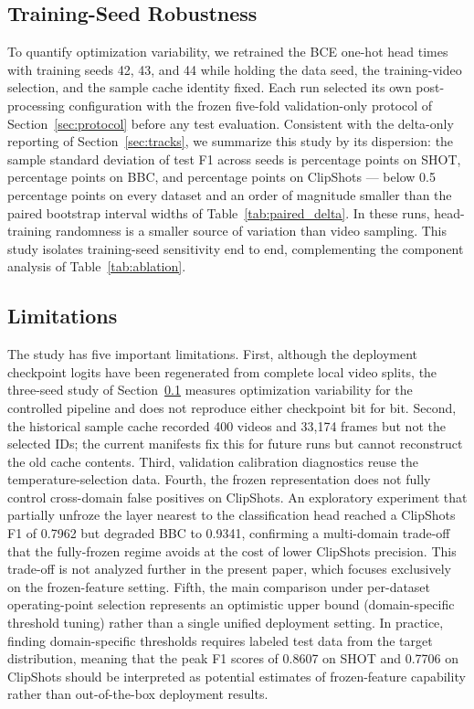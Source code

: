 \subsection{Training-Seed Robustness}
\label{sec:seed_robustness}

To quantify optimization variability, we retrained the BCE one-hot head
\PaperSeedCount{} times with training seeds 42, 43, and 44 while holding the
data seed, the training-video selection, and the sample cache identity fixed.
Each run selected its own post-processing configuration with the frozen
five-fold validation-only protocol of Section~\ref{sec:protocol} before any
test evaluation. Consistent with the delta-only reporting of
Section~\ref{sec:tracks}, we summarize this study by its dispersion: the
sample standard deviation of test F1 across seeds is
\PaperSeedShotFOneStd{} percentage points on SHOT,
\PaperSeedBBCFOneStd{} percentage points on BBC, and
\PaperSeedClipFOneStd{} percentage points on ClipShots --- below
0.5 percentage points on every dataset and an
order of magnitude smaller than the paired bootstrap interval widths of
Table~\ref{tab:paired_delta}. In these runs, head-training randomness is a
smaller source of variation than video sampling. This study isolates
training-seed sensitivity end to end, complementing the component analysis of
Table~\ref{tab:ablation}.

\subsection{Limitations}

The study has five important limitations. First, although the deployment
checkpoint logits have been regenerated from complete local video splits, the
three-seed study of Section~\ref{sec:seed_robustness} measures optimization
variability for the controlled pipeline and does not reproduce either
checkpoint bit for bit. Second, the historical sample cache recorded 400
videos and 33,174 frames but not the selected IDs; the current manifests fix
this for future runs but cannot reconstruct the old cache contents. Third,
validation calibration diagnostics reuse the temperature-selection data.
Fourth, the frozen representation does not fully control cross-domain false
positives on ClipShots. An exploratory experiment that partially unfroze the
layer nearest to the classification head reached a ClipShots F1 of 0.7962
but degraded BBC to 0.9341, confirming a multi-domain trade-off that the
fully-frozen regime avoids at the cost of lower ClipShots precision. This
trade-off is not analyzed further in the present paper, which focuses
exclusively on the frozen-feature setting.
Fifth, the main comparison under per-dataset operating-point selection represents an optimistic upper bound (domain-specific threshold tuning) rather than a single unified deployment setting. In practice, finding domain-specific thresholds requires labeled test data from the target distribution, meaning that the peak F1 scores of 0.8607 on SHOT and 0.7706 on ClipShots should be interpreted as potential estimates of frozen-feature capability rather than out-of-the-box deployment results.
